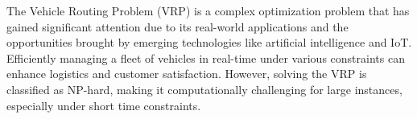 


The Vehicle Routing Problem (VRP) is a complex optimization problem that has gained significant attention due to its real-world applications and the opportunities brought by emerging technologies like artificial intelligence and IoT\cite{10379532,SHAHIN2024104437}. Efficiently managing a fleet of vehicles in real-time under various constraints can enhance logistics and customer satisfaction. However, solving the VRP is classified as NP-hard, making it computationally challenging for large instances, especially under short time constraints\cite{10379532}.

